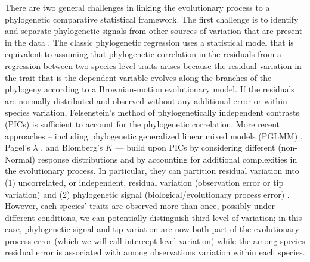 \documentclass[12pt]{article}
\begin{document}
There are two general challenges in linking the evolutionary process to a phylogenetic comparative statistical framework.
The first challenge is to identify and separate phylogenetic signals from other sources of variation that are present in the data \citep{blomberg2003testing}.  
The classic phylogenetic regression uses a statistical model that is equivalent to assuming that phylogenetic correlation in the residuals from a regression between two species-level traits arises because the residual variation in the trait that is the dependent variable evolves along the branches of the phylogeny according to a Brownian-motion evolutionary model. 
If the residuals are normally distributed and observed without any additional error or within-species variation, Felsenstein's method of phylogenetically independent contrasts (PICs) \citep{felsenstein1985phylogenies, nicolakakis2000forebrain} is sufficient to account for the phylogenetic correlation.
More recent approaches -- including phylogenetic generalized linear mixed models (PGLMM) \citep{ives2011generalized}, Pagel's $\lambda$ \citep{pagel1999inferring}, and Blomberg's $K$ \citep{blomberg2003testing} --- build upon PICs by considering different (non-Normal) response distributions and by accounting for additional complexities in the evolutionary process. 
In particular, they can partition residual variation into (1) uncorrelated, or independent, residual variation (observation error or tip variation) and (2) phylogenetic signal  (biological/evolutionary process error) \citep{hansen2012interpreting}.
However, each species' traits are observed more than once, possibly under different conditions, we can potentially distinguish third level of variation; in this case, phylogenetic signal and tip variation are now both part of the evolutionary process error (which we will call intercept-level variation) while the among species residual error is associated with among observations variation within each species.
\end{document}
